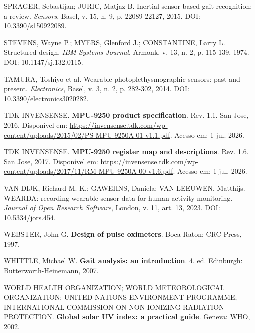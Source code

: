 \documentclass[a4paper,12pt]{article}
\begin{document}
\noindent SPRAGER, Sebastijan; JURIC, Matjaz B. Inertial sensor-based gait recognition: a review. \emph{Sensors}, Basel, v. 15, n. 9, p. 22089-22127, 2015. DOI: 10.3390/s150922089.\par\medskip

\noindent STEVENS, Wayne P.; MYERS, Glenford J.; CONSTANTINE, Larry L. Structured design. \emph{IBM Systems Journal}, Armonk, v. 13, n. 2, p. 115-139, 1974. DOI: 10.1147/sj.132.0115.\par\medskip

\noindent TAMURA, Toshiyo et al. Wearable photoplethysmographic sensors: past and present. \emph{Electronics}, Basel, v. 3, n. 2, p. 282-302, 2014. DOI: 10.3390/electronics3020282.\par\medskip

\noindent TDK INVENSENSE. \textbf{MPU-9250 product specification}. Rev. 1.1. San Jose, 2016. Disponível em: \url{https://invensense.tdk.com/wp-content/uploads/2015/02/PS-MPU-9250A-01-v1.1.pdf}. Acesso em: 1 jul. 2026.\par\medskip

\noindent TDK INVENSENSE. \textbf{MPU-9250 register map and descriptions}. Rev. 1.6. San Jose, 2017. Disponível em: \url{https://invensense.tdk.com/wp-content/uploads/2017/11/RM-MPU-9250A-00-v1.6.pdf}. Acesso em: 1 jul. 2026.\par\medskip

\noindent VAN DIJK, Richard M. K.; GAWEHNS, Daniela; VAN LEEUWEN, Matthijs. WEARDA: recording wearable sensor data for human activity monitoring. \emph{Journal of Open Research Software}, London, v. 11, art. 13, 2023. DOI: 10.5334/jors.454.\par\medskip

\noindent WEBSTER, John G. \textbf{Design of pulse oximeters}. Boca Raton: CRC Press, 1997.\par\medskip

\noindent WHITTLE, Michael W. \textbf{Gait analysis: an introduction}. 4. ed. Edinburgh: Butterworth-Heinemann, 2007.\par\medskip

\noindent WORLD HEALTH ORGANIZATION; WORLD METEOROLOGICAL ORGANIZATION; UNITED NATIONS ENVIRONMENT PROGRAMME; INTERNATIONAL COMMISSION ON NON-IONIZING RADIATION PROTECTION. \textbf{Global solar UV index: a practical guide}. Geneva: WHO, 2002. \par\medskip
\end{document}

